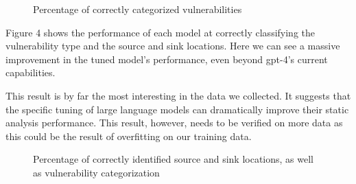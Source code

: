 \documentclass[acmsmall]{acmart}
\begin{document}
\begin{figure}[htp] 
  \caption{Percentage of correctly categorized vulnerabilities}
  \end{figure}

Figure 4 shows the performance of each model at correctly classifying the vulnerability type and the source and sink locations. Here we can see a massive improvement in the tuned model's performance, even beyond gpt-4's current capabilities. 

This result is by far the most interesting in the data we collected. It suggests that the specific tuning of large language models can dramatically improve their static analysis performance. This result, however, needs to be verified on more data as this could be the result of overfitting on our training data.\\
  

\begin{figure}[htp] 
\caption{Percentage of correctly identified source and sink locations, as well as vulnerability categorization}
\end{figure}
\end{document}
